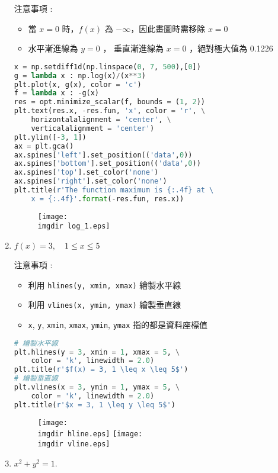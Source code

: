 \begin{enumerate}
注意事項 : 
\begin{itemize}
\item
當 $x = 0$ 時，$f(x)$ 為 $-\infty$，因此畫圖時需移除 $x = 0$
\item
水平漸進線為 $y = 0$ ， 垂直漸進線為 $x =0$ ，絕對極大值為 0.1226
\end{itemize}
\bigskip
\begin{lstlisting}[language = Python]
x = np.setdiff1d(np.linspace(0, 7, 500),[0])  
g = lambda x : np.log(x)/(x**3)
plt.plot(x, g(x), color = 'c')
f = lambda x : -g(x)
res = opt.minimize_scalar(f, bounds = (1, 2)) 
plt.text(res.x, -res.fun, 'x', color = 'r', \
	horizontalalignment = 'center', \
	verticalalignment = 'center')
plt.ylim([-3, 1])
ax = plt.gca()
ax.spines['left'].set_position(('data',0)) 
ax.spines['bottom'].set_position(('data',0)) 
ax.spines['top'].set_color('none')
ax.spines['right'].set_color('none')
plt.title(r'The function maximum is {:.4f} at \
	x = {:.4f}'.format(-res.fun, res.x))
\end{lstlisting}
\begin{figure}[H]
    \centering
        \texttt{[image: \\imgdir log\_1.eps]}
\end{figure}
\item
$f(x) = 3,\quad 1 \leq x \leq 5$

注意事項 : 
\begin{itemize}
\item
利用 \verb|hlines(y, xmin, xmax)| 繪製水平線
\item
利用 \verb|vlines(x, ymin, ymax)| 繪製垂直線
\item
\verb|x|, \verb|y|, \verb|xmin|, \verb|xmax|, \verb|ymin|, \verb|ymax| 指的都是資料座標值
\end{itemize}
\bigskip
\begin{lstlisting}[language = Python]
# 繪製水平線
plt.hlines(y = 3, xmin = 1, xmax = 5, \
	color = 'k', linewidth = 2.0)
plt.title(r'$f(x) = 3, 1 \leq x \leq 5$')
# 繪製垂直線
plt.vlines(x = 3, ymin = 1, ymax = 5, \
	color = 'k', linewidth = 2.0)
plt.title(r'$x = 3, 1 \leq y \leq 5$')
\end{lstlisting}
\begin{figure}[H]
\centering
\texttt{[image: \\imgdir hline.eps]}
\texttt{[image: \\imgdir vline.eps]}
\end{figure}
\item
$x^2 + y^2 = 1$. 


\end{enumerate}
